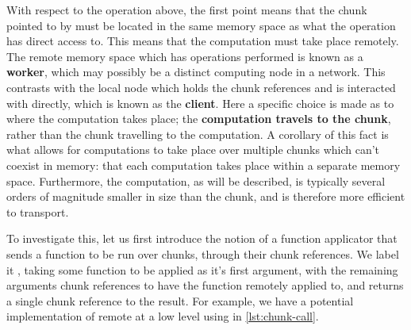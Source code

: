 With respect to the  operation above, the first point means
that the chunk pointed to by  must be located in the same
memory space as what the  operation has direct access to.
This means that the computation must take place remotely. The remote
memory space which has operations performed is known as a
\textbf{worker}, which may possibly be a distinct computing node in a
network. This contrasts with the local node which holds the chunk
references and is interacted with directly, which is known as the
\textbf{client}. Here a specific choice is made as to where the
computation takes place; the \textbf{computation travels to the chunk},
rather than the chunk travelling to the computation. A corollary of this
fact is what allows for computations to take place over multiple chunks
which can't coexist in memory: that each computation takes place within
a separate memory space. Furthermore, the computation, as will be
described, is typically several orders of magnitude smaller in size than
the chunk, and is therefore more efficient to transport.

To investigate this, let us first introduce the notion of a function
applicator that sends a function to be run over chunks, through their
chunk references. We label it , taking some function
to be applied as it's first argument, with the remaining arguments chunk
references to have the function remotely applied to, and returns a
single chunk reference to the result. For example, we have a potential
implementation of remote  at a low level using
 in \cref{lst:chunk-call}.


